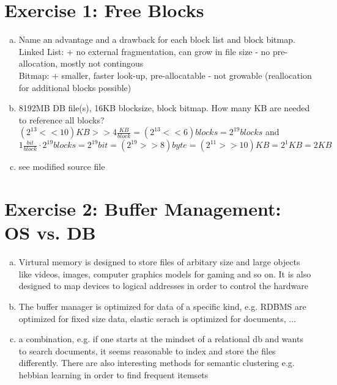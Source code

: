 \documentclass[a4paper]{article}
\begin{document}
	\section*{Exercise 1: Free Blocks}\label{sec:exercise1}
   \begin{enumerate}[a.]
		\item Name an advantage and a drawback for each block list
            and block bitmap. \\
            Linked List: + no external fragmentation, can grow in file 
            size - no pre-allocation, mostly not contingous \\
            Bitmap: + smaller, faster look-up, pre-allocatable 
            - not growable (reallocation for additional blocks possible)\\
        \item 8192MB DB file(s), 16KB blocksize, block bitmap. How 
            many KB are needed to reference all blocks? \\
            $(2^{13} << 10 )KB >> 4 \frac{KB}{block} = (2^{13} << 6) 
            blocks = 2^{19} blocks$  and \\
            $ 1 \frac{bit}{block} \cdot 2^{19} blocks = 2^{19} bit
            = (2^{19} >> 8) byte = (2^{11} >> 10) KB = 2^{1} KB = 2 KB$ \\
        \item see modified source file
   \end{enumerate}

	\section*{Exercise 2: Buffer Management: OS vs. DB}\label{sec:exercise2}
        \begin{enumerate}[a.]
            \item Virtural memory is designed to store files of arbitary size and large objects like videos, images, computer graphics models for gaming and so on. It is also designed to map devices to logical addresses in order to control the hardware
            \item The buffer manager is optimized for data of a specific kind, e.g. RDBMS are optimized for fixed size data, elastic serach is optimized for documents, ...
	    \item a combination, e.g. if one starts at the mindset of a relational db and wants to search documents, it seems reasonable to index and store the files differently. There are also interesting methods for semantic clustering e.g. hebbian learning in order to find frequent itemsets
        \end{enumerate}
\end{document}
